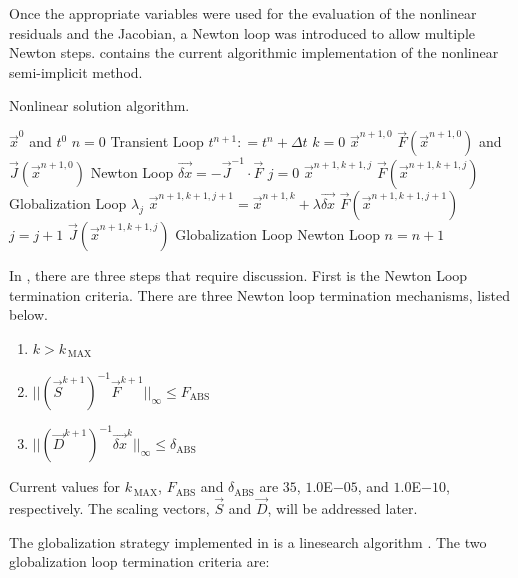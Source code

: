 Once the appropriate variables were used for the evaluation of the nonlinear residuals and the Jacobian, a Newton loop was introduced to allow multiple Newton steps.
 contains the current algorithmic implementation of the nonlinear semi-implicit method.

\begin{algo}[H]
\caption{Nonlinear \cobra{} solution algorithm.}
\label{alg:nl_cobra}
\setlength{\baselineskip}{0.625\baselineskip}
\begin{algorithmic}[1]
\Require $\vec{x}^{0}$ and $t^{0}$
\Set $n = 0$
\Loop \; Transient Loop
    \State $t^{n+1} : = t^{n} + \Delta t$
    \State $k = 0$
    \Define $\vec{x}^{n+1,0}$
	\Calculate $\vec{F}(\vec{x}^{n+1,0})$ and $\vec{J}(\vec{x}^{n+1,0})$
    \Loop \; Newton Loop
		\Calculate $\vec{\delta x} = - \vec{J}^{-1}\cdot\vec{F}$
		$j = 0$		
		\Calculate $\vec{x}^{n+1,k+1,j}$
		\Calculate $\vec{F}(\vec{x}^{n+1,k+1,j})$
		\Loop \; Globalization Loop
				\Calculate $\lambda_j$
				\Calculate $\vec{x}^{n+1,k+1,j+1} = \vec{x}^{n+1,k} + \lambda \vec{\delta x}$
				\Calculate $\vec{F}(\vec{x}^{n+1,k+1,j+1})$
				\State $j = j + 1$			
			\Else
				\Calculate $\vec{J}(\vec{x}^{n+1,k+1,j})$
				\Exit Globalization Loop
			\EndIf
		\EndLoop			
			\Exit Newton Loop
		\EndIf
	\EndLoop
	\State $n = n + 1$
\EndLoop
\end{algorithmic}
\end{algo}

In , there are three steps that require discussion.
First is the Newton Loop termination criteria.
There are three Newton loop termination mechanisms, listed below.

\begin{enumerate}
\item{$k > k_{\,\text{MAX}}$}
\item{$||(\vec{S}^{k+1})^{-1}\vec{F}^{k+1}||_{\infty} \leq F_{\text{ABS}}$}
\item{$||(\vec{D}^{k+1})^{-1}\vec{\delta x}^{k}||_{\infty} \leq \delta_{\text{ABS}}$}
\end{enumerate}

Current values for $k_{\,\text{MAX}}$, $F_{\text{ABS}}$ and $\delta_{\text{ABS}}$ are $35$, $1.0$E$-05$, and $1.0$E$-10$, respectively.
The scaling vectors, $\vec{S}$ and $\vec{D}$, will be addressed later.

The globalization strategy implemented in \cobra{} is a linesearch algorithm \cite{Dennis1996}.
The two globalization loop termination criteria are:


